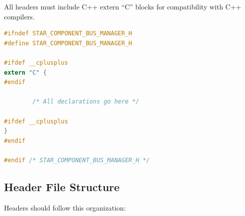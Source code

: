 All headers must include C++ extern ``C'' blocks for compatibility with C++ compilers.

\begin{lstlisting}[language=C]
#ifndef STAR_COMPONENT_BUS_MANAGER_H
#define STAR_COMPONENT_BUS_MANAGER_H

#ifdef __cplusplus
extern "C" {
#endif

        /* All declarations go here */

#ifdef __cplusplus
}
#endif

#endif /* STAR_COMPONENT_BUS_MANAGER_H */
\end{lstlisting}

\subsection{Header File Structure}

Headers should follow this organization:

